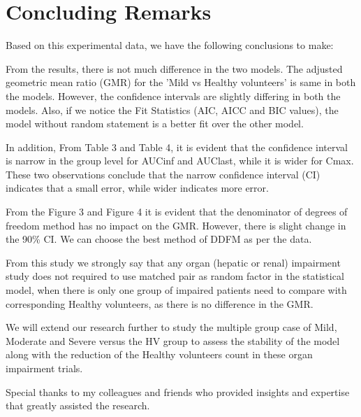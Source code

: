 \documentclass[final]{statistica}
\begin{document}
\section{Concluding Remarks}
Based on this experimental data, we have the following conclusions to make:
\vspace{3mm}
\par
From the results, there is not much difference in the two models. The adjusted geometric mean ratio (GMR) for the 'Mild vs Healthy volunteers' is same in both the models. However, the confidence intervals are slightly differing in both the models. Also, if we notice the Fit Statistics (AIC, AICC and BIC values), the model without random statement is a better fit over the other model.
\vspace{3mm}
\par
In addition, From Table 3 and Table 4, it is evident that the confidence interval is narrow in the group level for AUCinf and AUClast, while it is wider for Cmax. These two observations conclude that the narrow confidence interval (CI) indicates that a small error, while wider indicates more error.
\vspace{3mm}
\par
From the Figure 3 and Figure 4 it is evident that the denominator of degrees of freedom method has no impact on the GMR. However, there is slight change in the 90\% CI. We can choose the best method of DDFM as per the data.
\vspace{3mm}
\par
From this study we strongly say that any organ (hepatic or renal) impairment study does not required to use matched pair as random factor in the statistical model, when there is only one group of impaired patients need to compare with corresponding Healthy volunteers, as there is no difference in the GMR.
\vspace{3mm}
\par
We will extend our research further to study the multiple group case of Mild, Moderate and Severe versus the HV group to assess the stability of the model along with the reduction of the Healthy volunteers count in these organ impairment trials.
\vspace{3mm}

\begin{ack}
Special thanks to my colleagues and friends who provided insights and expertise that greatly assisted the research.
\end{ack}

\vspace{3mm}

\nocite{*}

\end{document}
